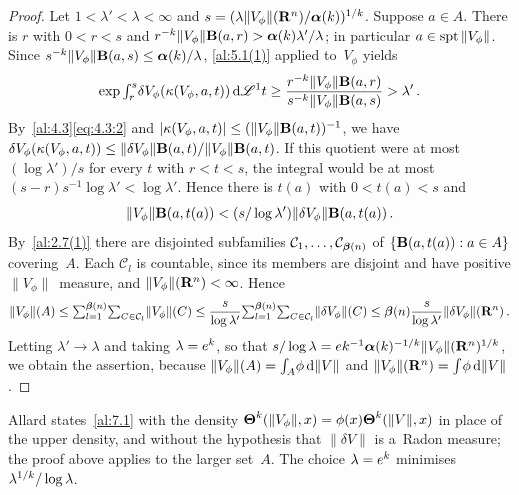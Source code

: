 \begin{proof}
    Let $1 < \lambda' < \lambda < \infty$ and $s = (\lambda \|V_\phi\|(\mathbf{R}^{n}) /
    \boldsymbol{\alpha}(k))^{1/k}$. Suppose $a \in A$. There is $r$ with $0 < r < s$ and
    $r^{-k} \|V_\phi\| \mathbf{B}(a,r) > \boldsymbol{\alpha}(k) \lambda' / \lambda$; in particular $a
    \in \operatorname{spt} \|V_\phi\|$. Since $s^{-k} \|V_\phi\| \mathbf{B}(a,s) \le \boldsymbol{\alpha}(k) /
    \lambda$, \ref{al:5.1(1)} applied to~$V_\phi$ yields
    \begin{displaymath}
        \exp {\textstyle\int_{r}^{s}} \delta V_\phi(\kappa(V_\phi,a,t)) \,\mathrm{d} \mathscr{L}^1 t \ge \frac{r^{-k}
        \|V_\phi\| \mathbf{B}(a,r)}{s^{-k} \|V_\phi\| \mathbf{B}(a,s)} > \lambda' \,.
    \end{displaymath}
    By~\ref{al:4.3}\eqref{eq:4.3:2} and $|\kappa(V_\phi,a,t)| \le (\|V_\phi\|
    \mathbf{B}(a,t))^{-1}$, we have $\delta V_\phi(\kappa(V_\phi,a,t)) \le \|\delta V_\phi\|
    \mathbf{B}(a,t) / \|V_\phi\| \mathbf{B}(a,t)$. If this quotient were at most $(\log \lambda') / s$ for
    every $t$ with $r < t < s$, the integral would be at most $(s - r) s^{-1} \log \lambda' <
    \log \lambda'$. Hence there is $t(a)$ with $0 < t(a) < s$ and
    \begin{displaymath}
        \|V_\phi\| \mathbf{B}(a,t(a)) < (s / \log \lambda') \|\delta V_\phi\| \mathbf{B}(a,t(a)) \,.
    \end{displaymath}
    By~\ref{al:2.7(1)} there are disjointed subfamilies $\mathcal{C}_1, \ldots,
    \mathcal{C}_{\boldsymbol{\beta}(n)}$ of $\{ \mathbf{B}(a,t(a)) : a \in A \}$ covering~$A$. Each
    $\mathcal{C}_l$ is countable, since its members are disjoint and have positive
    $\|V_\phi\|$~measure, and $\|V_\phi\|(\mathbf{R}^{n}) < \infty$. Hence
    \begin{displaymath}
        \|V_\phi\|(A) \le {\textstyle\sum_{l=1}^{\boldsymbol{\beta}(n)}} {\textstyle\sum_{C \in \mathcal{C}_l}^{}}
        \|V_\phi\|(C) \le \frac{s}{\log \lambda'} {\textstyle\sum_{l=1}^{\boldsymbol{\beta}(n)}} {\textstyle\sum_{C \in
        \mathcal{C}_l}^{}} \|\delta V_\phi\|(C) \le \boldsymbol{\beta}(n) \frac{s}{\log \lambda'}
        \|\delta V_\phi\|(\mathbf{R}^{n}) \,.
    \end{displaymath}
    Letting $\lambda' \to \lambda$ and taking $\lambda = e^{k}$, so that $s / \log \lambda = e
    k^{-1} \boldsymbol{\alpha}(k)^{-1/k} \|V_\phi\|(\mathbf{R}^{n})^{1/k}$, we obtain the
    assertion, because $\|V_\phi\|(A) = {\textstyle\int_{A}^{}} \phi \,\mathrm{d} \|V\|$ and $\|V_\phi\|(\mathbf{R}^{n}) =
    {\textstyle\int_{}^{}} \phi \,\mathrm{d} \|V\|$.
\end{proof}

\begin{remark}
    \label{rem:7.1}
    Allard states~\ref{al:7.1} with the density $\boldsymbol{\Theta}^{k}(\|V_\phi\|,x) = \phi(x)
    \boldsymbol{\Theta}^{k}(\|V\|,x)$ in place of the upper density, and without the hypothesis that
    $\|\delta V\|$ is a~Radon measure; the proof above applies to the larger set~$A$. The
    choice $\lambda = e^{k}$ minimises $\lambda^{1/k} / \log \lambda$.
\end{remark}

